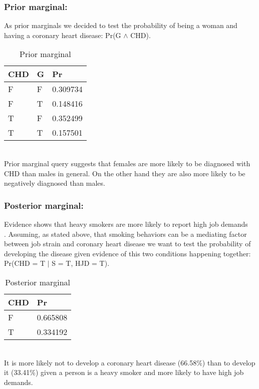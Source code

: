 \subsubsection{Prior marginal:}
As prior marginals we decided to test the probability of being a woman and having a coronary heart disease: Pr(G $\wedge$ CHD).
\\
\begin{table}
\centering
\caption{Prior marginal}\label{tab1}
\begin{tabular}{p{1.2cm} p{1.2cm} p{1.2cm}}
CHD &  G &  Pr\\
\hline
F & {F} & 0.309734\\
F &  {T} & 0.148416\\
T & {F} & 0.352499\\
T & {T} & 0.157501\\
\end{tabular}
\end{table}\\
Prior marginal query suggests that females are more likely to be diagnosed with CHD than males in general. On the other hand they are also more likely to be negatively diagnosed than males.
\subsubsection{Posterior marginal:} 
Evidence shows that heavy smokers are more likely to report high job demands ~\cite{ref_article3} . Assuming, as stated above, that smoking behaviors can be a mediating factor between job strain and coronary heart disease we want to test the probability of developing the disease given evidence of this two conditions happening together: Pr(CHD = T $\mid$ S = T, HJD = T).
\\
\begin{table}
\centering
\caption{Posterior marginal}\label{tab2}
\begin{tabular}{p{1.2cm} p{1.2cm}}
CHD &  Pr\\
\hline
F &  0.665808\\
T &  0.334192\\
\end{tabular}
\end{table}
\\
It is more likely not to develop a coronary heart disease (66.58\%) than to develop it (33.41\%) given a person is a heavy smoker and more likely to have high job demands. 

